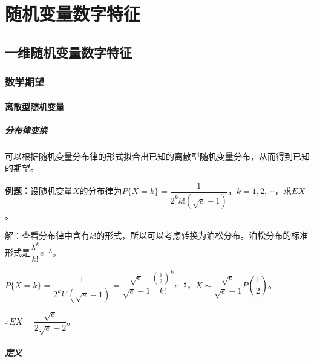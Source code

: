 \setcounter{tocdepth}{4}
\setcounter{secnumdepth}{4}
\renewcommand{\baselinestretch}{1.5}
\chapter{随机变量数字特征}
\section{一维随机变量数字特征}

\subsection{数学期望}

\subsubsection{离散型随机变量}

\paragraph{分布律变换} \leavevmode \medskip

可以根据随机变量分布律的形式拟合出已知的离散型随机变量分布，从而得到已知的期望。

\textbf{例题：}设随机变量$X$的分布律为$P\{X=k\}=\dfrac{1}{2^kk!(\sqrt{e}-1)}$，$k=1,2,\cdots$，求$EX$。

解：查看分布律中含有$k!$的形式，所以可以考虑转换为泊松分布。泊松分布的标准形式是$\dfrac{\lambda^k}{k!}e^{-\lambda}$。

$P\{X=k\}=\dfrac{1}{2^kk!(\sqrt{e}-1)}=\dfrac{\sqrt{e}}{\sqrt{e}-1}\dfrac{\left(\frac{1}{2}\right)^k}{k!}e^{-\frac{1}{2}}$，$X\sim\dfrac{\sqrt{e}}{\sqrt{e}-1}P\left(\dfrac{1}{2}\right)$。

$\therefore EX=\dfrac{\sqrt{e}}{2\sqrt{e}-2}$。

\paragraph{定义} \leavevmode \medskip

